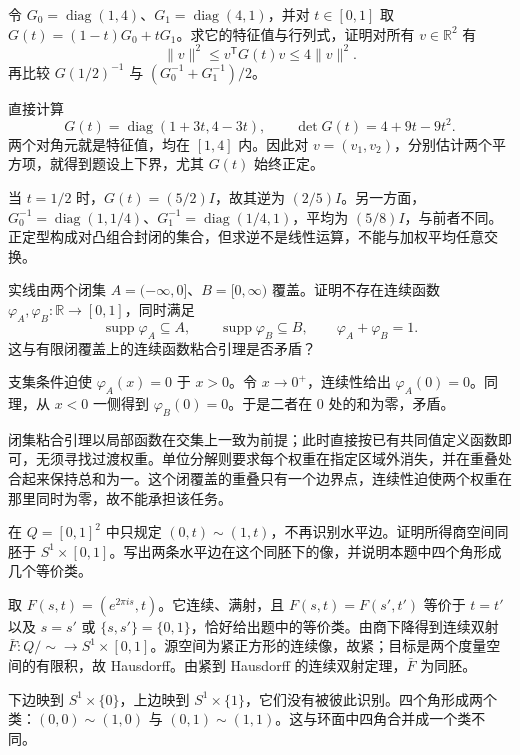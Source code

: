 \begin{exercise}\label{g1:ex:averaging-positive-forms}
	令 \(G_0=\operatorname{diag}(1,4)\)、\(G_1=\operatorname{diag}(4,1)\)，并对 \(t\in[0,1]\) 取 \(G(t)=(1-t)G_0+tG_1\)。求它的特征值与行列式，证明对所有 \(v\in\mathbb R^2\) 有
	\[
		\lVert v\rVert^2\le v^{\mathsf T}G(t)v\le4\lVert v\rVert^2.
	\]
	再比较 \(G(1/2)^{-1}\) 与 \((G_0^{-1}+G_1^{-1})/2\)。
\end{exercise}
\begin{solution}
	直接计算
	\[
		G(t)=\operatorname{diag}(1+3t,4-3t),\qquad
		\det G(t)=4+9t-9t^2.
	\]
	两个对角元就是特征值，均在 \([1,4]\) 内。因此对 \(v=(v_1,v_2)\)，分别估计两个平方项，就得到题设上下界，尤其 \(G(t)\) 始终正定。

	当 \(t=1/2\) 时，\(G(t)=(5/2)I\)，故其逆为 \((2/5)I\)。另一方面，\(G_0^{-1}=\operatorname{diag}(1,1/4)\)、\(G_1^{-1}=\operatorname{diag}(1/4,1)\)，平均为 \((5/8)I\)，与前者不同。正定型构成对凸组合封闭的集合，但求逆不是线性运算，不能与加权平均任意交换。
\end{solution}

\begin{exercise}\label{g1:ex:closed-cover-partition-failure}
	实线由两个闭集 \(A=(-\infty,0]\)、\(B=[0,\infty)\) 覆盖。证明不存在连续函数 \(\varphi_A,\varphi_B:\mathbb R\rightarrow[0,1]\)，同时满足
	\[
		\operatorname{supp}\varphi_A\subseteq A,\qquad
		\operatorname{supp}\varphi_B\subseteq B,\qquad
		\varphi_A+\varphi_B=1.
	\]
	这与有限闭覆盖上的连续函数粘合引理是否矛盾？
\end{exercise}
\begin{solution}
	支集条件迫使 \(\varphi_A(x)=0\) 于 \(x>0\)。令 \(x\to0^+\)，连续性给出 \(\varphi_A(0)=0\)。同理，从 \(x<0\) 一侧得到 \(\varphi_B(0)=0\)。于是二者在 \(0\) 处的和为零，矛盾。

	闭集粘合引理以局部函数在交集上一致为前提；此时直接按已有共同值定义函数即可，无须寻找过渡权重。单位分解则要求每个权重在指定区域外消失，并在重叠处合起来保持总和为一。这个闭覆盖的重叠只有一个边界点，连续性迫使两个权重在那里同时为零，故不能承担该任务。
\end{solution}

\begin{exercise}\label{g1:ex:cylinder-quotient}
	在 \(Q=[0,1]^2\) 中只规定 \((0,t)\sim(1,t)\)，不再识别水平边。证明所得商空间同胚于 \(S^1\times[0,1]\)。写出两条水平边在这个同胚下的像，并说明本题中四个角形成几个等价类。
\end{exercise}
\begin{solution}
	取 \(F(s,t)=(e^{2\pi is},t)\)。它连续、满射，且 \(F(s,t)=F(s',t')\) 等价于 \(t=t'\) 以及 \(s=s'\) 或 \(\{s,s'\}=\{0,1\}\)，恰好给出题中的等价类。由商下降得到连续双射 \(\bar F:Q/{\sim}\to S^1\times[0,1]\)。源空间为紧正方形的连续像，故紧；目标是两个度量空间的有限积，故 Hausdorff。由紧到 Hausdorff 的连续双射定理，\(\bar F\) 为同胚。

	下边映到 \(S^1\times\{0\}\)，上边映到 \(S^1\times\{1\}\)，它们没有被彼此识别。四个角形成两个类：\((0,0)\sim(1,0)\) 与 \((0,1)\sim(1,1)\)。这与环面中四角合并成一个类不同。
\end{solution}

